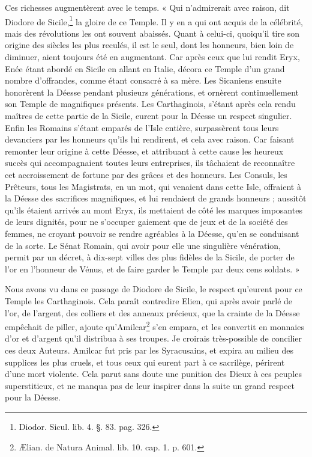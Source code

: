 \documentclass[a4paper, 11pt, oneside, polutonikogreek, french]{article}
\begin{document}
Ces richesses augmentèrent avec le temps. « Qui n'admirerait avec raison, dit Diodore de Sicile,\footnote{Diodor. Sicul. lib. 4. §. 83. pag. 326.} la gloire de ce Temple. Il y en a qui ont acquis de la célébrité, mais des révolutions les ont souvent abaissés. Quant à celui-ci, quoiqu'il tire son origine des siècles les plus reculés, il est le seul, dont les honneurs, bien loin de diminuer, aient toujours été en augmentant. Car après ceux que lui rendit Eryx, Enée étant abordé en Sicile en allant en Italie, décora ce Temple d'un grand nombre d'offrandes, comme étant consacré à sa mère. Les Sicaniens ensuite honorèrent la Déesse pendant plusieurs générations, et ornèrent continuellement son Temple de magnifiques présents. Les Carthaginois, s'étant après cela rendu maîtres de cette partie de la Sicile, eurent pour la Déesse un respect singulier. Enfin les Romains s'étant emparés de l'Isle entière, surpassèrent tous leurs devanciers par les honneurs qu'ils lui rendirent, et cela avec raison. Car faisant remonter leur origine à cette Déesse, et attribuant à cette cause les heureux succès qui accompagnaient toutes leurs entreprises, ils tâchaient de reconnaître cet accroissement de fortune par des grâces et des honneurs. Les Consuls, les Prêteurs, tous les Magistrats, en un mot, qui venaient dans cette Isle, offraient à la Déesse des sacrifices magnifiques, et lui rendaient de grands honneurs ; aussitôt qu'ils étaient arrivés au mont Eryx, ils mettaient de côté les marques imposantes de leurs dignités, pour ne s'occuper gaiement que de jeux et de la société des femmes, ne croyant pouvoir se rendre agréables à la Déesse, qu'en se conduisant de la sorte. Le Sénat Romain, qui avoir pour elle une singulière vénération, permit par un décret, à dix-sept villes des plus fidèles de la Sicile, de porter de l'or en l'honneur de Vénus, et de faire garder le Temple par deux cens soldats. »

Nous avons vu dans ce passage de Diodore de Sicile, le respect qu'eurent pour ce Temple les Carthaginois. Cela paraît contredire Elien, qui après avoir parlé de l'or, de l'argent, des colliers et des anneaux précieux, que la crainte de la Déesse empêchait de piller, ajoute qu'Amilcar\footnote{Ælian. de Natura Animal. lib. 10. cap. 1. p. 601.} s'en empara, et les convertit en monnaies d'or et d'argent qu'il distribua à ses troupes. Je croirais très-possible de concilier ces deux Auteurs. Amilcar fut pris par les Syracusains, et expira au milieu des supplices les plus cruels, et tous ceux qui eurent part à ce sacrilège, périrent d'une mort violente. Cela parut sans doute une punition des Dieux à ces peuples superstitieux, et ne manqua pas de leur inspirer dans la suite un grand respect pour la Déesse.
\end{document}
